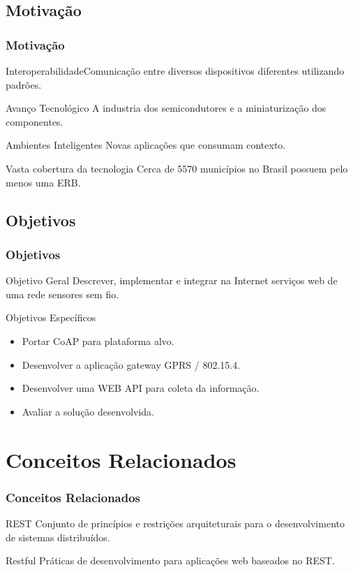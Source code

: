 \documentclass{beamer}
\begin{document}
\subsection{Motivação}
\begin{frame}
\frametitle{Motivação}
\begin{block}{Interoperabilidade}Comunicação entre diversos dispositivos diferentes utilizando padrões.
\end{block}
    \begin{block}{Avanço Tecnológico}
        A industria dos semicondutores e a miniaturização dos componentes.
    \end{block}
    \begin{block}{Ambientes Inteligentes}
        Novas aplicações que consumam contexto.
    \end{block}
\begin{block}{Vasta cobertura da tecnologia}
    Cerca de 5570 municípios no Brasil possuem pelo menos uma ERB.
\end{block}
\end{frame}

\subsection{Objetivos}
\begin{frame}
\frametitle{Objetivos}
\begin{block}{Objetivo Geral}
    Descrever, implementar e integrar na Internet serviços web de uma rede sensores sem fio.
\end{block}
\begin{block}{Objetivos Específicos}
\begin{itemize}
\item Portar CoAP para plataforma alvo.
\item Desenvolver a aplicação gateway GPRS / 802.15.4.
\item Desenvolver uma WEB API para coleta da informação.
\item Avaliar a solução desenvolvida.
\end{itemize}
\end{block}
\end{frame}


\section{Conceitos Relacionados}
\begin{frame}
\frametitle{Conceitos Relacionados}

\begin{block}{REST}
    Conjunto de princípios e restrições arquiteturais para o desenvolvimento de sistemas distribuídos.
\end{block}
\begin{block}{Restful}
    Práticas de desenvolvimento para aplicações web baseados no REST.
\end{block}
\end{frame}
\end{document}
